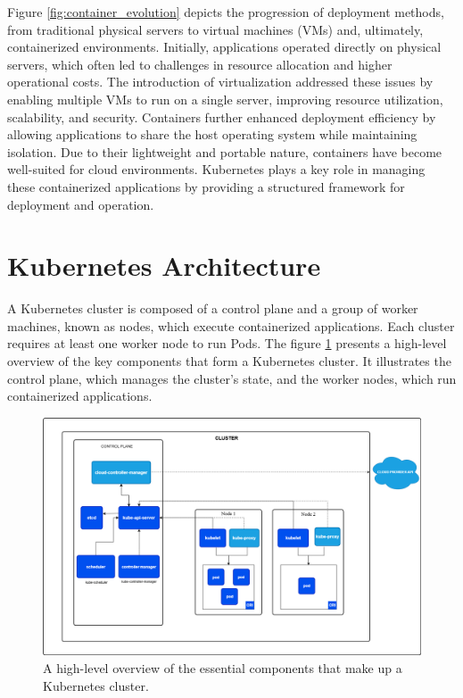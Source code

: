 \documentclass[../main.tex]{subfiles}
\begin{document}
Figure \ref{fig:container_evolution} depicts the progression of deployment methods, from traditional physical servers to virtual machines (VMs) and, ultimately, containerized environments. Initially, applications operated directly on physical servers, which often led to challenges in resource allocation and higher operational costs. The introduction of virtualization addressed these issues by enabling multiple VMs to run on a single server, improving resource utilization, scalability, and security. Containers further enhanced deployment efficiency by allowing applications to share the host operating system while maintaining isolation. Due to their lightweight and portable nature, containers have become well-suited for cloud environments. Kubernetes plays a key role in managing these containerized applications by providing a structured framework for deployment and operation. \cite{kubernetes}

\section{Kubernetes Architecture}

 A Kubernetes cluster is composed of a control plane and a group of worker machines, known as nodes, which execute containerized applications. Each cluster requires at least one worker node to run Pods. The figure \ref{fig:components} presents a high-level overview of the key components that form a Kubernetes cluster. It illustrates the control plane, which manages the cluster's state, and the worker nodes, which run containerized applications. \cite{kubernetes}
 
\begin{figure}[H]
    \centering
    \includegraphics[scale=0.3]{img/3-background/kubernetes/components.png}
    \caption{A high-level overview of the essential components that make up a Kubernetes cluster. \protect\footnotemark}
    \label{fig:components}
\end{figure}
\end{document}
